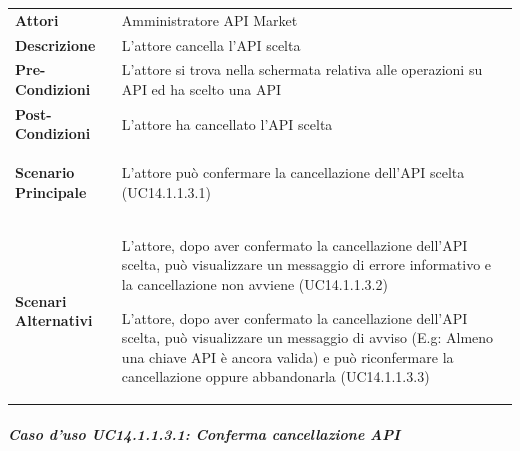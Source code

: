 \begin{minipage}{\linewidth}
	\begin{tabular}{ l | p{11cm}}
		\hline
		\rowcolor{Gray}
		\multicolumn{2}{c}{UC14.1.1.3 - Cancellazione API} \\
		\hline
		\textbf{Attori} & Amministratore API Market \\
		\textbf{Descrizione} & L'attore cancella l'API scelta \\
		\textbf{Pre-Condizioni} & L'attore si trova nella schermata relativa alle operazioni su API ed ha scelto una API \\
		\textbf{Post-Condizioni} & L'attore ha cancellato l'API scelta \\
		\textbf{Scenario Principale} & 
		\begin{enumerate*}[label=(\arabic*.),itemjoin={\newline}]
			\item L'attore può confermare la cancellazione dell'API scelta (UC14.1.1.3.1)
		\end{enumerate*}\\
		\textbf{Scenari Alternativi} & 
		\begin{enumerate*}[label=(\arabic*.),itemjoin={\newline}]
			\item L'attore, dopo aver confermato la cancellazione dell'API scelta, può visualizzare un messaggio di errore informativo e la cancellazione non avviene (UC14.1.1.3.2)
			\item L'attore, dopo aver confermato la cancellazione dell'API scelta, può visualizzare un messaggio di avviso (E.g: Almeno una chiave API è ancora valida) e può riconfermare la cancellazione oppure abbandonarla (UC14.1.1.3.3)
		\end{enumerate*}\\
	\end{tabular}
\end{minipage}

\subparagraph{Caso d'uso UC14.1.1.3.1: Conferma cancellazione API}
\label{UC14_1_1_3_1}


